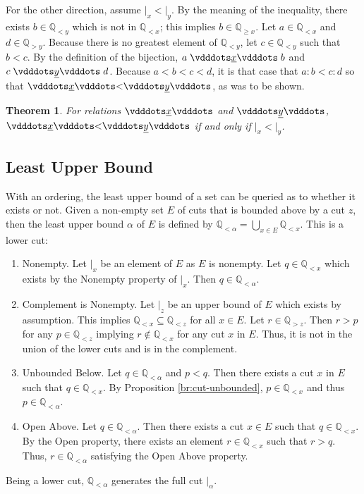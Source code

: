 \documentclass[12pt]{article}
\newtheorem{theorem}{Theorem}[section]
\newcommand{\qcut}[2][x]{\ensuremath{\mathbb{Q}_{#2 #1}}}
\newcommand{\qlt}[1][x]{\qcut[#1]{<}}
\newcommand{\qgt}[1][x]{\qcut[#1]{>}}
\newcommand{\qgeq}[1][x]{\qcut[#1]{\geq}}
\newcommand{\cut}[1][x]{{\vert}_{#1} }
\newcommand{\yrel}{\xrel[y]}
\begin{document}
For the other direction, assume $\cut < \cut[y]$. By the meaning of the inequality, there exists $b \in \qlt[y]$ which is not in $\qlt$; this implies $b \in \qgeq$. Let $a \in \qlt$ and $d \in \qgt[y]$.  Because there is no greatest element of $\qlt[y]$, let $c\in \qlt[y]$ such that $b < c$. By the definition of the bijection,  $a \xrel b$ and $c \yrel d$. Because $a < b < c < d$, it is that case that $a:b < c:d$ so that $\xrel < \yrel$, as was to be shown. 

\begin{theorem}
For relations $\xrel$ and $\yrel$, $\xrel < \yrel$ if and only if $\cut < \cut[y]$.
\end{theorem}

\subsection{Least Upper Bound}

With an ordering, the least upper bound of a set can be queried as to whether it exists or not. Given a non-empty set $E$ of cuts that is bounded above by a cut $z$, then the least upper bound $\alpha$ of $E$ is defined by $\qlt[\alpha] = \bigcup_{x \in E} \qlt$. This is a lower cut: 
\begin{enumerate}
    \item Nonempty. Let $\cut$ be an element of $E$ as $E$ is nonempty. Let $q \in \qlt$ which exists by the Nonempty property of $\cut$. Then $q \in \qlt[\alpha]$.
    \item Complement is Nonempty. Let $\cut[z]$ be an upper bound of $E$ which exists by assumption. This implies $\qlt \subseteq \qlt[z]$ for all $x \in E$. Let $r \in \qgt[z]$. Then $r > p$ for any $p \in \qlt[z]$ implying $r \notin \qlt[x]$ for any cut $x$ in $E$. Thus, it is not in the union of the lower cuts and is in the complement. 
    \item Unbounded Below. Let $q \in \qlt[\alpha]$ and $p < q$. Then there exists a cut $x$ in $E$ such that $q \in \qlt$. By Proposition \ref{br:cut-unbounded}, $p \in \qlt$ and thus $p \in \qlt[\alpha]$.
    \item Open Above. Let $q \in \qlt[\alpha]$. Then there exists a cut $x \in E$ such that $q \in \qlt$. By the Open property, there exists an element $r \in \qlt$ such that $r > q$. Thus, $r \in \qlt[\alpha]$ satisfying the Open Above property. 
\end{enumerate}
Being a lower cut, $\qlt[\alpha]$ generates the full cut $\cut[\alpha]$.
\end{document}
